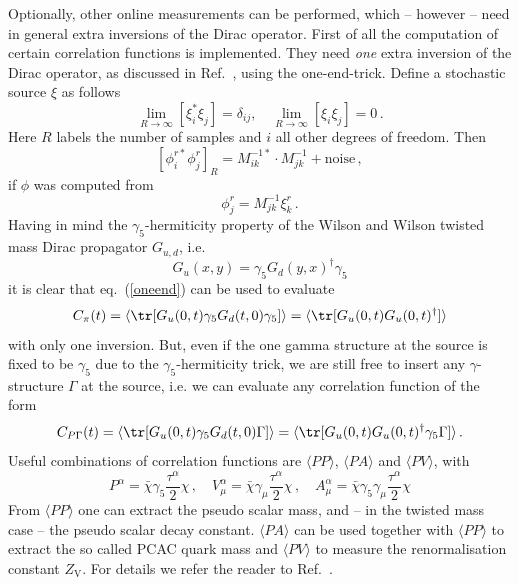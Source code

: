 Optionally, other online measurements can be performed, which --
however -- need in general extra inversions of the Dirac
operator. First of all the computation of certain correlation
functions is implemented. They need \emph{one} extra inversion of the
Dirac operator, as discussed in Ref.~\cite{Boucaud:2008xu}, using the
one-end-trick. Define a stochastic source $\xi$ as follows
\begin{equation}
  \label{eq:source}
  \lim_{R\to\infty}[\xi_i^*\xi_j] = \delta_{ij},\quad
  \lim_{R\to\infty}[\xi_i\xi_j] = 0\, .
\end{equation}
Here $R$ labels the number of samples and $i$ all other degrees of
freedom. Then 
\begin{equation}
  \label{oneend}
  [\phi_i^{r*}\phi_j^r]_R = M_{ik}^{-1*}\cdot M_{jk}^{-1} +
  \textrm{noise}\, ,
\end{equation}
if $\phi$ was computed from
\[
\phi_j^r  = M^{-1}_{jk}\xi_k^r\, .
\]
Having in mind the $\gamma_5$-hermiticity property of the Wilson and
Wilson twisted mass Dirac propagator $G_{u,d}$, i.e.
\[
G_u(x,y) = \gamma_5 G_d(y,x)^\dagger \gamma_5
\]
it is clear that eq.~(\ref{oneend}) can be used to evaluate
\[
C_\pi(t) = \langle \tr[G_u(0,t)\gamma_5 G_d(t,0)\gamma_5]\rangle =
\langle \tr[G_u(0,t) G_u(0,t)^\dagger]\rangle
\]
with only one inversion. But, even if the one gamma structure at the
source is fixed to be $\gamma_5$ due to the $\gamma_5$-hermiticity
trick, we are still free to insert any $\gamma$-structure $\Gamma$ at the source,
i.e. we can evaluate any correlation function of the form
\[
C_{P\Gamma}(t) = \langle\tr[G_u(0,t) \gamma_5 G_d(t,0) \Gamma]\rangle
= \langle \tr[G_u(0,t) G_u(0,t)^\dagger\gamma_5\Gamma]\rangle\, .
\]
Useful combinations of correlation functions are $\langle P P\rangle$,
$\langle PA\rangle$ and $\langle PV\rangle$, with
\[
  P^\alpha = \bar\chi \gamma_5 \frac{\tau^\alpha}{2}\chi\, ,\quad
  V^\alpha_\mu = \bar\chi \gamma_\mu\frac{\tau^\alpha}{2}\chi\, ,\quad
  A^\alpha_\mu = \bar\chi \gamma_5\gamma_\mu\frac{\tau^\alpha}{2}\chi
\]
From $\langle P P\rangle$ one can extract the pseudo scalar mass, and
-- in the twisted mass case -- the pseudo scalar decay
constant. $\langle PA\rangle$ can be used together with $\langle P
P\rangle$ to extract the so called PCAC quark mass and $\langle
PV\rangle$ to measure the renormalisation constant $Z_\mathrm{V}$. For
details we refer the reader to Ref.~\cite{Boucaud:2008xu}.

